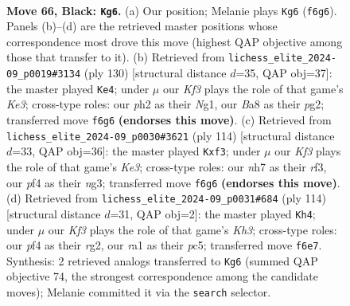 \documentclass[11pt]{article}
\begin{document}
\clearpage

\begin{figure}[p]\centering
\begin{subfigure}{0.46\textwidth}\centering
\resizebox{\linewidth}{!}{%
\newchessgame
\chessboard[
  setfen={b7/P6N/5k2/8/1p3P2/1n4PB/4K2P/R7 b - - 1 66},
  showmover=false,
  pgfstyle=straightmove, color=movearrow, markmove={f6-g6}
]}
\caption{}
\end{subfigure}\hfill
\begin{subfigure}{0.46\textwidth}\centering
\resizebox{\linewidth}{!}{%
\newchessgame
\chessboard[
  setfen={8/7p/7P/2k1p3/3p1n2/1P2K3/6p1/6N1 w - - 0 66},
  showmover=false,
  pgfstyle=straightmove, color=movearrow, markmove={e3-e4}
]}
\caption{}
\end{subfigure}
\\[4pt]
\begin{subfigure}{0.46\textwidth}\centering
\resizebox{\linewidth}{!}{%
\newchessgame
\chessboard[
  setfen={8/7k/6p1/2p3P1/2b4p/4KrnP/8/8 w - - 0 58},
  showmover=false,
  pgfstyle=straightmove, color=movearrow, markmove={e3-f3}
]}
\caption{}
\end{subfigure}\hfill
\begin{subfigure}{0.46\textwidth}\centering
\resizebox{\linewidth}{!}{%
\newchessgame
\chessboard[
  setfen={8/8/3p4/p1p5/b1P2k2/5p1K/6r1/8 w - - 8 58},
  showmover=false,
  pgfstyle=straightmove, color=movearrow, markmove={h3-h4}
]}
\caption{}
\end{subfigure}
\caption{\textbf{Move 66, Black: \texttt{Kg6}.} (a) Our position; Melanie plays \texttt{Kg6} (\texttt{f6g6}). Panels (b)--(d) are the retrieved master positions whose correspondence most drove this move (highest QAP objective among those that transfer to it). (b) Retrieved from \texttt{lichess\_elite\_2024-09\_p0019\#3134} (ply 130) [structural distance $d$=35, QAP obj=37]: the master played \texttt{Ke4}; under $\mu$ our \emph{Kf3} plays the role of that game's \emph{Ke3}; cross-type roles: our \emph{p}h2 as their \emph{N}g1, our \emph{B}a8 as their \emph{p}g2; transferred move \texttt{f6g6} \textbf{(endorses this move)}. (c) Retrieved from \texttt{lichess\_elite\_2024-09\_p0030\#3621} (ply 114) [structural distance $d$=33, QAP obj=36]: the master played \texttt{Kxf3}; under $\mu$ our \emph{Kf3} plays the role of that game's \emph{Ke3}; cross-type roles: our \emph{n}h7 as their \emph{r}f3, our \emph{p}f4 as their \emph{n}g3; transferred move \texttt{f6g6} \textbf{(endorses this move)}. (d) Retrieved from \texttt{lichess\_elite\_2024-09\_p0031\#684} (ply 114) [structural distance $d$=31, QAP obj=2]: the master played \texttt{Kh4}; under $\mu$ our \emph{Kf3} plays the role of that game's \emph{Kh3}; cross-type roles: our \emph{p}f4 as their \emph{r}g2, our \emph{r}a1 as their \emph{p}c5; transferred move \texttt{f6e7}. Synthesis: 2 retrieved analogs transferred to \texttt{Kg6} (summed QAP objective 74, the strongest correspondence among the candidate moves); Melanie committed it via the \texttt{search} selector.}
\label{fig:thought-m131}
\end{figure}
\end{document}
